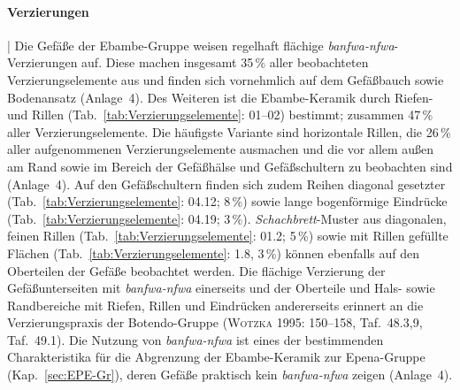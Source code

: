 \paragraph{Verzierungen}\hspace{-.5em}|\hspace{.5em}%
Die Gefäße der Ebambe-Gruppe weisen regelhaft flächige \textit{banfwa-nfwa}-Verzierungen auf. Diese machen insgesamt 35\,\% aller beobachteten Verzierungselemente aus und finden sich vornehmlich auf dem Gefäßbauch sowie Bodenansatz (Anlage~4). Des Weiteren ist die Ebambe-Keramik durch Riefen- und Rillen (Tab.~\ref{tab:Verzierungselemente}: 01--02) bestimmt; zusammen 47\,\% aller Verzierungselemente. Die häufigste Variante sind horizontale Rillen, die 26\,\% aller aufgenommenen Verzierungselemente ausmachen und die vor allem außen am Rand sowie im Bereich der Gefäßhälse und Gefäßschultern zu beobachten sind (Anlage~4). Auf den Gefäßschultern finden sich zudem Reihen diagonal gesetzter (Tab.~\ref{tab:Verzierungselemente}: 04.12; 8\,\%) sowie lange bogenförmige Eindrücke (Tab.~\ref{tab:Verzierungselemente}: 04.19; 3\,\%). \textit{Schachbrett}-Muster aus diagonalen, feinen Rillen (Tab.~\ref{tab:Verzierungselemente}: 01.2; 5\,\%) sowie mit Rillen gefüllte Flächen (Tab.~\ref{tab:Verzierungselemente}: 1.8, 3\,\%) können ebenfalls auf den Oberteilen der Gefäße beobachtet werden. Die flächige Verzierung der Gefäßunterseiten mit \textit{banfwa-nfwa} einerseits und der Oberteile und Hals- sowie Randbereiche mit Riefen, Rillen und Eindrücken andererseits erinnert an die Verzierungspraxis der Botendo-Gruppe (\textsc{Wotzka} 1995: 150--158, Taf.~48.3,9, Taf.~49.1). Die Nutzung von \textit{banfwa-nfwa} ist eines der bestimmenden Charakteristika für die Abgrenzung der Ebambe-Keramik zur Epena-Gruppe (Kap.~\ref{sec:EPE-Gr}), deren Gefäße praktisch kein \textit{banfwa-nfwa} zeigen (Anlage~4). 

